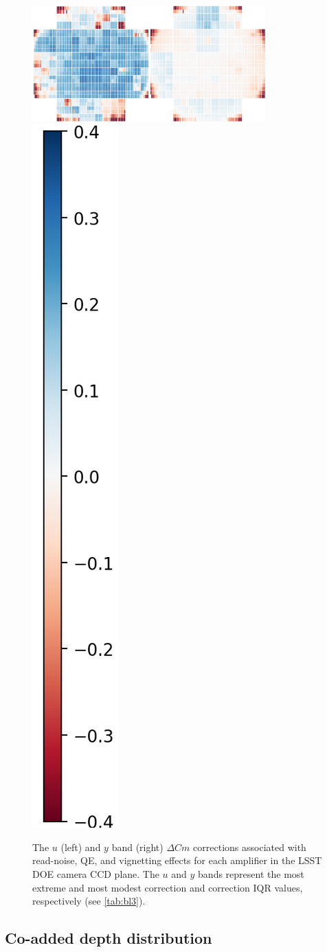 \documentclass[PST,authoryear,toc]{lsstdoc}
\begin{document}
\begin{figure}[!hb]
    \centering

\includegraphics[width=0.4\textwidth]{figures/ccdplaneU.png}\includegraphics[width=0.4\textwidth]{figures/ccdplaneY.png}\includegraphics[height=0.4\textwidth]{figures/colorbar.png}
\caption{The $u$ (left) and $y$ band (right) $\Delta Cm$ corrections associated with read-noise, QE, and vignetting effects for each amplifier in the LSST DOE camera CCD plane. The $u$ and $y$ bands represent the most extreme and most modest correction and correction IQR values, respectively (see \autoref{tab:bl3}).}\label{fig:ccdplane}
\end{figure}
 \FloatBarrier





\subsection{Co-added depth distribution}\label{sec:coadd}
\end{document}
